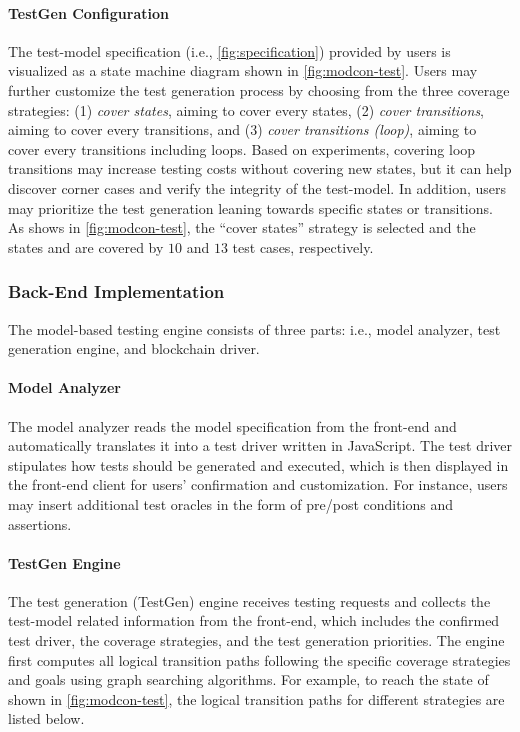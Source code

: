 \paragraph{TestGen Configuration}
The test-model specification (i.e., \cref{fig:specification}) provided by users is visualized as a
state machine diagram shown in \cref{fig:modcon-test}.
Users may further customize the test generation process by choosing from the three coverage
strategies: (1) \emph{cover states}, aiming to cover every states,
(2) \emph{cover transitions}, aiming to cover every transitions, and
(3) \emph{cover transitions (loop)}, aiming to cover every transitions including loops.
Based on experiments, covering loop transitions may increase testing costs without covering new
states, but it can help discover corner cases and verify the integrity of the test-model.
In addition, users may prioritize the test generation leaning towards specific states or
transitions.
As shows in \cref{fig:modcon-test}, the ``cover states'' strategy is selected and the states
 and  are covered by $10$ and $13$ test cases, respectively.


\subsubsection{Back-End Implementation}
\label{sec:backend}
The model-based testing engine consists of three parts: i.e., model analyzer, test generation
engine, and blockchain driver.

\paragraph{Model Analyzer}
The model analyzer reads the model specification from the front-end and automatically translates it
into a test driver written in JavaScript.
The test driver stipulates how tests should be generated and executed, which is then displayed in
the front-end client for users' confirmation and customization.
For instance, users may insert additional test oracles in the form of pre/post conditions and
assertions.

\paragraph{TestGen Engine}
The test generation (TestGen) engine receives testing requests and collects the test-model related
information from the front-end, which includes the confirmed test driver, the coverage strategies,
and the test generation priorities.
The engine first computes all logical transition paths following the specific coverage strategies
and goals using graph searching algorithms.
For example, to reach the  state of \wecredit shown in \cref{fig:modcon-test}, the
logical transition paths for different strategies are listed below.

